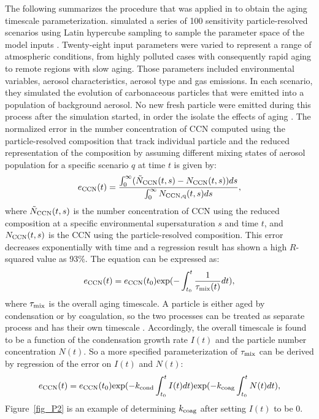 \documentclass[12pt, fullpage]{uiucthesis2009}
\begin{document}
	The following summarizes the procedure that was applied in \citet{Fierce2016} to obtain the aging timescale parameterization. \citet{Fierce2016} simulated a series of 100 sensitivity particle-resolved scenarios using Latin hypercube sampling to sample the parameter space of the model inputs \citep{mckay1979comparison}. Twenty-eight input parameters were varied to represent a range of atmospheric conditions, from highly polluted cases with consequently rapid aging to remote regions with slow aging. Those parameters included environmental variables, aerosol characteristics, aerosol type and gas emissions. In each scenario, they simulated the evolution of carbonaceous particles that were emitted into a population of background aerosol. No new fresh particle were emitted during this process after the simulation started, in order the isolate the effects of aging \citep{Fierce2016}. The normalized error in the number concentration of CCN computed using the particle-resolved composition that track individual particle and the reduced representation of the composition by assuming different mixing states of aerosol population for a specific scenario $q$ at time $t$ is given by:
	\begin{align}\label{eq:11}
	e_{\rm CCN}(t) = \frac{\int_{0}^{\infty}( \tilde{N}_{\rm CCN}(t,s) - 
		N_{\rm CCN} (t,s))ds}{\int_{0}^{\infty} N_{\rm CCN, q}(t,s)ds},
	\end{align}
	where $\tilde{N}_{\rm CCN}(t,s)$ is the number concentration of CCN using the reduced composition at a specific environmental supersaturation $s$ and time $t$, and $N_{\rm CCN}(t,s)$ is the CCN using the particle-resolved composition. This error decreases exponentially with time and a regression result has shown a high $R$-squared value as 93$\%$. The equation can be expressed as:
	\begin{align}
	e_{\rm CCN}(t) = e_{\rm CCN}(t_{0})\text{exp}(-\int_{t_{0}}^{t}\frac{1}{\tau_{\rm mix}(t)} dt), 
	\end{align}
	where $\tau_{\rm mix}$ is the overall aging timescale. 
	A particle is either aged by condensation or by coagulation, so the two processes can be treated as separate process and has their own timescale \citep{Fierce2015}. Accordingly, the overall timescale is found to be a function of the condensation growth rate $I(t)$ and the particle number concentration $N(t)$.
	So a more specified parameterization of $\tau_{\rm mix}$ can be derived by regression of the error on $I(t)$ and $N(t)$:
	\begin{align}
	e_{\rm CCN}(t) = e_{\rm CCN}(t_{0})\text{exp}(-k_{\rm cond}\int_{t_{0}}^{t} I(t) dt)\text{exp}(-k_{\rm coag}\int_{t_{0}}^{t}N(t) dt), 
	\end{align}
	Figure~\ref{fig_P2} is an example of determining $k_{\rm coag}$ after setting $I(t)$ to be 0. 
	
\end{document}
